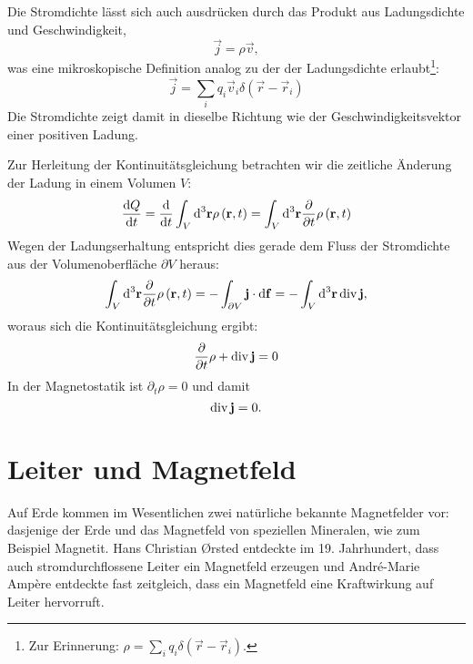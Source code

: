 Die Stromdichte lässt sich auch ausdrücken durch das Produkt aus Ladungsdichte und Geschwindigkeit,
\begin{equation*}
	\vec {j}=\rho \vec {v},
\end{equation*}
was eine mikroskopische Definition analog zu der der Ladungsdichte erlaubt\footnote{Zur Erinnerung: $\rho =\sum _{i}q_{i}\delta \left(\vec {r}-\vec {r}_{i}\right)$.}:
\begin{equation*}
	\vec {j}=\sum _{i}q_{i}\vec {v}_{i}\delta \left(\vec {r}-\vec {r}_{i}\right)
\end{equation*}
Die Stromdichte zeigt damit in dieselbe Richtung wie der Geschwindigkeitsvektor einer positiven Ladung. 

Zur Herleitung der Kontinuitätsgleichung betrachten wir die zeitliche Änderung der Ladung in einem Volumen $V$:
\begin{equation*}
	\frac{\text{d} Q}{\text{d} t}=\frac{\text{d} }{\text{d} t}\int _{V}\text{d}^{3}\mathbf{r}\rho \left(\mathbf{r},t\right)=\int _{V}\text{d} ^{3}\mathbf{r}\frac{\partial }{\partial t}\rho \left(\mathbf{r},t\right)
\end{equation*}
Wegen der Ladungserhaltung entspricht dies gerade dem Fluss der Stromdichte aus der Volumenoberfläche $\partial V$ heraus:
\begin{equation*}
	\int _{V}\text{d} ^{3}\mathbf{r}\frac{\partial }{\partial t}\rho \left(\mathbf{r},t\right)=-\int _{\partial V}\mathbf{j}\cdot \text{d} \mathbf{f}=-\int _{V}\text{d} ^{3}\mathbf{r}\operatorname{div} \mathbf{j},
\end{equation*}
woraus sich die Kontinuitätsgleichung ergibt:
\begin{equation*}
	\frac{\partial }{\partial t}\rho +\operatorname{div} \mathbf{j}=0
\end{equation*}
In der Magnetostatik ist $\partial _{t}\rho =0$ und damit
\begin{equation*}
	\operatorname{div} \mathbf{j}=0.
\end{equation*}
\section{Leiter und Magnetfeld}

Auf Erde kommen im Wesentlichen zwei natürliche bekannte Magnetfelder vor: dasjenige der Erde und das Magnetfeld von speziellen Mineralen, wie zum Beispiel Magnetit. Hans Christian \O{}rsted entdeckte im 19. Jahrhundert, dass auch stromdurchflossene Leiter ein Magnetfeld erzeugen und André-Marie Ampère entdeckte fast zeitgleich, dass ein Magnetfeld eine Kraftwirkung auf Leiter hervorruft.

